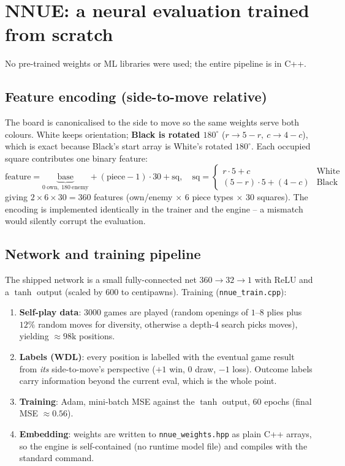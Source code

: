 \documentclass[11pt]{article}
\newcommand{\code}[1]{\texttt{#1}}
\begin{document}
\section{NNUE: a neural evaluation trained from scratch}\label{sec:nnue}
No pre-trained weights or ML libraries were used; the entire pipeline is in C++.

\subsection{Feature encoding (side-to-move relative)}
The board is canonicalised to the side to move so the same weights serve both
colours. White keeps orientation; \textbf{Black is rotated $180^\circ$}
($r\!\to\!5{-}r,\ c\!\to\!4{-}c$), which is exact because Black's start array is
White's rotated $180^\circ$. Each occupied square contributes one binary feature:
\begin{equation}
\text{feature} = \underbrace{\text{base}}_{0\ \text{own},\ 180\ \text{enemy}}
 + (\text{piece}-1)\cdot 30 + \text{sq},\quad
\text{sq}=\begin{cases} r\cdot5+c & \text{White}\\ (5{-}r)\cdot5+(4{-}c) & \text{Black}\end{cases}
\end{equation}
giving $2\times6\times30 = 360$ features (own/enemy $\times$ 6 piece types $\times$
30 squares). The encoding is implemented identically in the trainer and the
engine -- a mismatch would silently corrupt the evaluation.

\subsection{Network and training pipeline}
The shipped network is a small fully-connected net $360 \to 32 \to 1$ with ReLU
and a $\tanh$ output (scaled by $600$ to centipawns). Training (\code{nnue\_train.cpp}):
\begin{enumerate}[nosep]
  \item \textbf{Self-play data}: $3000$ games are played (random openings of
        $1$--$8$ plies plus $12\%$ random moves for diversity, otherwise a
        depth-4 search picks moves), yielding $\approx 98\text{k}$ positions.
  \item \textbf{Labels (WDL)}: every position is labelled with the eventual game
        result from \emph{its} side-to-move's perspective ($+1$ win, $0$ draw,
        $-1$ loss). Outcome labels carry information beyond the current eval,
        which is the whole point.
  \item \textbf{Training}: Adam, mini-batch MSE against the $\tanh$ output,
        $60$ epochs (final MSE $\approx 0.56$).
  \item \textbf{Embedding}: weights are written to \code{nnue\_weights.hpp} as
        plain C++ arrays, so the engine is self-contained (no runtime model
        file) and compiles with the standard command.
\end{enumerate}
\end{document}
